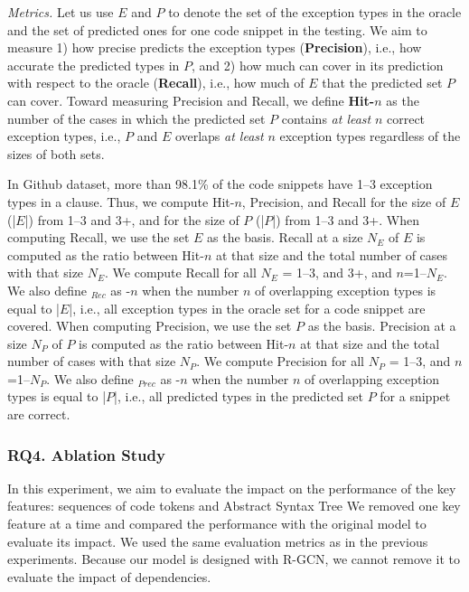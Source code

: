 {\em Metrics.} Let us use $E$ and $P$ to denote the set of the
exception types in the oracle and the set of predicted
ones for one code snippet in the testing. We aim to measure 1) how
precise {\tool} predicts the exception types ({\bf Precision}), i.e.,
how accurate the predicted types in $P$, and 2) how much {\tool} can
cover in its prediction with respect to the oracle ({\bf Recall}),
i.e., how much of $E$ that the predicted set $P$ can cover. Toward
measuring Precision and Recall, we define {\bf Hit-$n$} as the number
of the cases in which the predicted set $P$ contains
{\em at least} $n$ correct exception types, i.e., $P$ and $E$ overlaps
{\em at least} $n$ exception types regardless of the sizes of both
sets.

In Github dataset, more than 98.1\% of the code snippets have 1--3
exception types in a  clause. Thus, we compute Hit-$n$,
Precision, and Recall for the size of $E$ (|$E$|) from 1--3 and 3+,
and for the size of $P$ (|$P$|) from 1--3 and 3+.
%
When computing Recall, we use the set $E$ as the basis. Recall at a
size $N_E$ of $E$ is computed as the ratio between Hit-$n$ at that
size and the total number of cases with that size $N_E$. We compute
Recall for all $N_E$ = 1--3, and 3+, and $n$=1--$N_E$. We also define
{\bf {}$_{Rec}$} as -$n$ when the number $n$ of
overlapping exception types is equal to |$E$|, i.e., all exception
types in the oracle set for a code snippet are covered.
%
When computing Precision, we use the set $P$ as the basis. Precision
at a size $N_P$ of $P$ is computed as the ratio between Hit-$n$ at
that size and the total number of cases with that size $N_P$. We
compute Precision for all $N_P$ = 1--3, and $n$=1--$N_P$. We also
define {\bf {}$_{Prec}$} as -$n$ when the number $n$
of overlapping exception types is equal to |$P$|, i.e., all predicted
types in the predicted set $P$ for a snippet are
correct.



\subsubsection{RQ4. Ablation Study}

In this experiment, we aim to evaluate the impact on the performance
of the key features: sequences of code tokens and Abstract Syntax Tree
We removed one key feature at a time and compared the performance with
the original model to evaluate its impact. We used the same evaluation
metrics as in the previous experiments. Because our model is designed
with R-GCN, we cannot remove it to evaluate the impact of dependencies.

